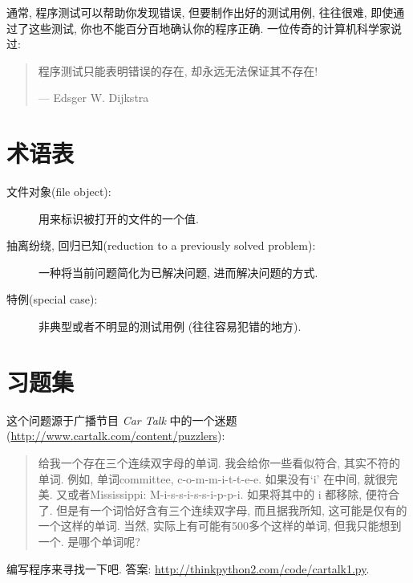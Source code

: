 \documentclass[10pt]{book}
\begin{document}
通常, 程序测试可以帮助你发现错误, 但要制作出好的测试用例, 
往往很难, 即使通过了这些测试, 你也不能百分百地确认你的程序正确. 
一位传奇的计算机科学家说过:

\begin{quote}

程序测试只能表明错误的存在, 却永远无法保证其不存在!

--- Edsger W. Dijkstra
\end{quote}


\section{术语表}

\begin{description}

\item[文件对象(file object):] 用来标识被打开的文件的一个值.

\item[抽离纷绕, 回归已知(reduction to a previously solved problem):] 一种将当前问题简化为已解决问题, 进而解决问题的方式.

\item[特例(special case):] 非典型或者不明显的测试用例
(往往容易犯错的地方).

\end{description}


\section{习题集}

\begin{exercise}

这个问题源于广播节目 {\em Car Talk} 中的一个迷题
(\url{http://www.cartalk.com/content/puzzlers}):

\begin{quote}
给我一个存在三个连续双字母的单词. 
我会给你一些看似符合, 其实不符的单词. 
例如, 单词committee,  c-o-m-m-i-t-t-e-e. 
如果没有`i' 在中间, 就很完美. 
又或者Mississippi: M-i-s-s-i-s-s-i-p-p-i.
如果将其中的 i 都移除, 便符合了. 
但是有一个词恰好含有三个连续双字母, 而且据我所知, 
这可能是仅有的一个这样的单词. 
当然, 实际上有可能有500多个这样的单词, 但我只能想到一个. 
是哪个单词呢?
\end{quote}

编写程序来寻找一下吧. 
答案: \url{http://thinkpython2.com/code/cartalk1.py}.

\end{exercise}
\end{document}
